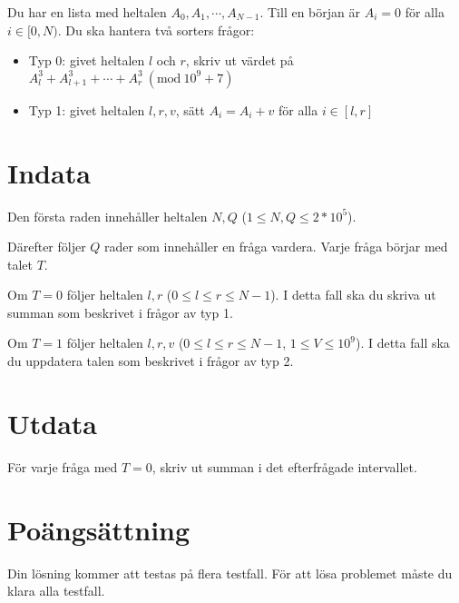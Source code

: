 \newcommand{\Mod}[1]{\ (\mathrm{mod}\ #1)}
Du har en lista med heltalen $A_0, A_1, \cdots, A_{N-1}$. Till en början är $A_i=0$ för alla $i \in [0,N)$.
Du ska hantera två sorters frågor:

\begin{itemize}
    \item Typ 0: givet heltalen $l$ och $r$, skriv ut värdet på  $A_l^3 + A_{l+1}^3 + \cdots + A_{r}^3 \Mod{10^9+7}$
    \item Typ 1: givet heltalen $l,r,v$, sätt $A_i=A_i+v$ för alla $i \in [l,r]$
\end{itemize}


\section*{Indata}
Den första raden innehåller heltalen $N, Q$ ($1 \leq N, Q \leq 2*10^5$).

Därefter följer $Q$ rader som innehåller en fråga vardera. Varje fråga börjar med talet $T$.

Om $T=0$ följer heltalen $l, r$ ($0 \leq l \leq r \leq N - 1$). I detta fall ska du skriva ut summan som beskrivet i frågor av typ 1.

Om $T=1$ följer heltalen $l, r, v$ ($0 \leq l \leq r \leq N - 1$, $1 \leq V \leq 10^9$). I detta fall ska du uppdatera talen som beskrivet i frågor av typ 2.


\section*{Utdata}
För varje fråga med $T=0$, skriv ut summan i det efterfrågade intervallet.

\section*{Poängsättning}
Din lösning kommer att testas på flera testfall.
\noindent
För att lösa problemet måste du klara alla testfall.
